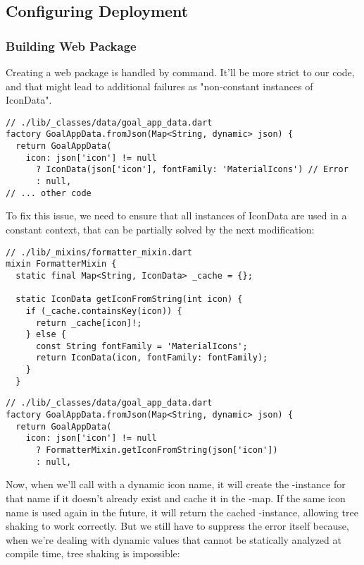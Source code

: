 
\newpage
\subsection{Configuring Deployment}


\subsubsection{Building Web Package} \label{deploy-web}

Creating a web package is handled by  command. It'll be more strict to our code, and 
that might lead to additional failures as "non-constant instances of IconData".

\begin{lstlisting}
// ./lib/_classes/data/goal_app_data.dart
factory GoalAppData.fromJson(Map<String, dynamic> json) {
  return GoalAppData(
    icon: json['icon'] != null
      ? IconData(json['icon'], fontFamily: 'MaterialIcons') // Error
      : null,
// ... other code
\end{lstlisting}

\noindent To fix this issue, we need to ensure that all instances of IconData are used in a constant context, that can 
be partially solved by the next modification:

\begin{lstlisting}
// ./lib/_mixins/formatter_mixin.dart
mixin FormatterMixin {
  static final Map<String, IconData> _cache = {};

  static IconData getIconFromString(int icon) {
    if (_cache.containsKey(icon)) {
      return _cache[icon]!;
    } else {
      const String fontFamily = 'MaterialIcons';
      return IconData(icon, fontFamily: fontFamily);
    }
  }
\end{lstlisting}
\begin{lstlisting}
// ./lib/_classes/data/goal_app_data.dart
factory GoalAppData.fromJson(Map<String, dynamic> json) {
  return GoalAppData(
    icon: json['icon'] != null
      ? FormatterMixin.getIconFromString(json['icon'])
      : null,
\end{lstlisting}

\noindent Now, when we'll call  with a dynamic icon name, it will create the -instance 
for that name if it doesn't already exist and cache it in the -map. If the same icon name is used again in 
the future, it will return the cached -instance, allowing tree shaking to work correctly. But we still have 
to suppress the error itself because, when we're dealing with dynamic values that cannot be statically analyzed at 
compile time, tree shaking is impossible:

